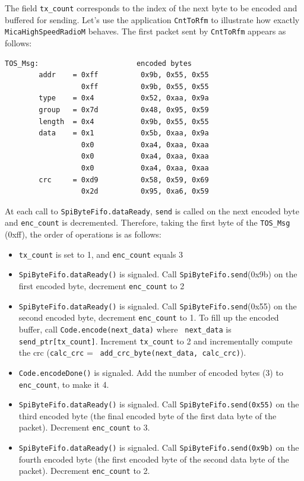 \documentclass[11pt]{article}
\begin{document}
The field {\tt tx\_count} corresponds to the index of the next byte to be
encoded and buffered for sending. Let's use the application {\tt CntToRfm}
to illustrate how exactly {\tt MicaHighSpeedRadioM} behaves. The first
packet sent by {\tt CntToRfm} appears as follows:

\newpage

\begin{verbatim}
TOS_Msg:                       encoded bytes 
        addr    = 0xff          0x9b, 0x55, 0x55
                  0xff          0x9b, 0x55, 0x55
        type    = 0x4           0x52, 0xaa, 0x9a
        group   = 0x7d          0x48, 0x95, 0x59
        length  = 0x4           0x9b, 0x55, 0x55
        data    = 0x1           0x5b, 0xaa, 0x9a
                  0x0           0xa4, 0xaa, 0xaa
                  0x0           0xa4, 0xaa, 0xaa
                  0x0           0xa4, 0xaa, 0xaa
        crc     = 0xd9          0x58, 0x59, 0x69
                  0x2d          0x95, 0xa6, 0x59
\end{verbatim}

At each call to {\tt SpiByteFifo.dataReady}, {\tt send} is called on
the next encoded byte and {\tt enc\_count} is decremented. Therefore,
taking the first byte of the {\tt TOS\_Msg} (0xff), the order of
operations is as follows:

\begin{itemize}
\item {\tt tx\_count} is set to 1, and {\tt enc\_count} equals 3

\item {\tt SpiByteFifo.dataReady()} is signaled. Call {\tt SpiByteFifo.send}(0x9b) on the first encoded byte, decrement {\tt enc\_count} to 2

\item {\tt SpiByteFifo.dataReady()} is signaled. Call {\tt SpiByteFifo.send}(0x55) on the second encoded byte, decrement {\tt enc\_count} to 1.  To fill up the encoded buffer, call {\tt Code.encode(next\_data)} where {\tt
next\_data} is {\tt send\_ptr[tx\_count]}. Increment {\tt tx\_count}
to 2 and incrementally compute the crc ({\tt calc\_crc} = {\tt
add\_crc\_byte(next\_data, calc\_crc)}).

\item {\tt Code.encodeDone()} is signaled. Add the number of encoded bytes (3) to {\tt enc\_count}, to make it 4.

\item {\tt SpiByteFifo.dataReady()} is signaled. Call {\tt SpiByteFifo.send(0x55)} on the third encoded byte (the final encoded byte of the first data byte of the packet). Decrement {\tt enc\_count} to 3.

\item {\tt SpiByteFifo.dataReady()} is signaled. Call {\tt SpiByteFifo.send(0x9b)} on the fourth encoded byte (the first encoded byte of the second data byte of the packet). Decrement {\tt enc\_count} to 2.

\end{itemize}
\end{document}
